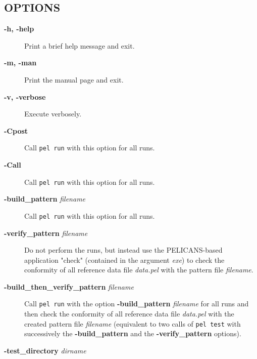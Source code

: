 \documentclass{article}
\begin{document}
\subsection*{OPTIONS\label{test_OPTIONS}}
\begin{description}

\item[\textbf{-h, -help}] \mbox{}

Print a brief help message and exit.


\item[\textbf{-m, -man}] \mbox{}

Print the manual page and exit.


\item[\textbf{-v, -verbose}] \mbox{}

Execute verbosely.


\item[\textbf{-Cpost}] \mbox{}

Call \texttt{pel run} with this option for all runs.


\item[\textbf{-Call}] \mbox{}

Call \texttt{pel run} with this option for all runs.


\item[\textbf{-build\_pattern} \emph{filename}] \mbox{}

Call \texttt{pel run} with this option for all runs.


\item[\textbf{-verify\_pattern} \emph{filename}] \mbox{}

Do not perform the runs, but instead use the PELICANS-based application
"check" (contained in the argument \emph{exe}) to check the conformity
of all reference data file \emph{data.pel} with the pattern file \emph{filename}.


\item[\textbf{-build\_then\_verify\_pattern} \emph{filename}] \mbox{}

Call \texttt{pel run} with the option \textbf{-build\_pattern} \emph{filename} 
for all runs and then check the conformity
of all reference data file \emph{data.pel} with the created pattern file
\emph{filename} (equivalent to two calls of \texttt{pel test}
with successively the \textbf{-build\_pattern} and the \textbf{-verify\_pattern} options).


\item[\textbf{-test\_directory} \emph{dirname}] \mbox{}


\end{description}
\end{document}
